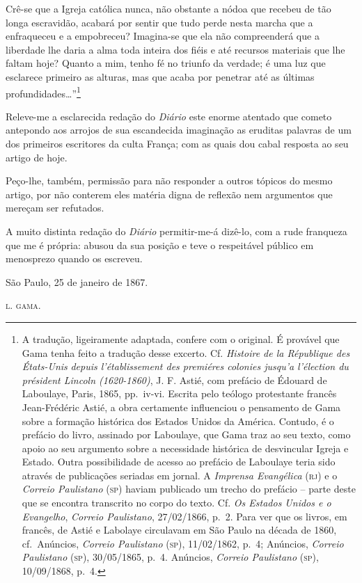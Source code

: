 Crê-se que a Igreja católica nunca, não obstante a nódoa que recebeu de
tão longa escravidão, acabará por sentir que tudo perde nesta marcha que
a enfraqueceu e a empobreceu? Imagina-se que ela não compreenderá que a
liberdade lhe daria a alma toda inteira dos fiéis e até recursos
materiais que lhe faltam hoje? Quanto a mim, tenho fé no triunfo da
verdade; é uma luz que esclarece primeiro as alturas, mas que acaba por
penetrar até as últimas profundidades\ldots{}''\footnote{A tradução,
  ligeiramente adaptada, confere com o original. É provável que Gama
  tenha feito a tradução desse excerto. Cf. \emph{Histoire de la
  République des États-Unis} \emph{depuis l'établissement des premiéres
  colonies jusqu'a l'élection du président Lincoln (1620-1860)}, J. F.
  Astié, com prefácio de Édouard de Laboulaye, Paris, 1865, pp.~iv-vi.
  Escrita pelo teólogo protestante francês Jean-Frédéric Astié, a obra
  certamente influenciou o pensamento de Gama sobre a formação histórica
  dos Estados Unidos da América. Contudo, é o prefácio do livro,
  assinado por Laboulaye, que Gama traz ao seu texto, como apoio ao seu
  argumento sobre a necessidade histórica de desvincular Igreja e
  Estado. Outra possibilidade de acesso ao prefácio de Laboulaye teria
  sido através de publicações seriadas em jornal. A \emph{Imprensa
  Evangélica} (\textsc{rj}) e o \emph{Correio Paulistano} (\textsc{sp}) haviam publicado
  um trecho do prefácio -- parte deste que se encontra transcrito no
  corpo do texto. Cf. \emph{Os Estados Unidos e o Evangelho},
  \emph{Correio Paulistano}, 27/02/1866, p.~2. Para ver que os livros,
  em francês, de Astié e Labolaye circulavam em São Paulo na década de
  1860, cf.~Anúncios, \emph{Correio Paulistano} (\textsc{sp}), 11/02/1862, p.~4;
  Anúncios, \emph{Correio Paulistano} (\textsc{sp}), 30/05/1865, p.~4. Anúncios,
  \emph{Correio Paulistano} (\textsc{sp}), 10/09/1868, p.~4.}

Releve-me a esclarecida redação do \emph{Diário} este enorme atentado
que cometo antepondo aos arrojos de sua escandecida imaginação as
eruditas palavras de um dos primeiros escritores da culta França; com as
quais dou cabal resposta ao seu artigo de hoje.

Peço-lhe, também, permissão para não responder a outros tópicos do mesmo
artigo, por não conterem eles matéria digna de reflexão nem argumentos
que mereçam ser refutados.

A muito distinta redação do \emph{Diário} permitir-me-á dizê-lo, com a
rude franqueza que me é própria: abusou da sua posição e teve o
respeitável público em menosprezo quando os escreveu.
\begin{flushright}
São Paulo, 25 de janeiro de 1867.

\textsc{l. gama}.
\end{flushright}
